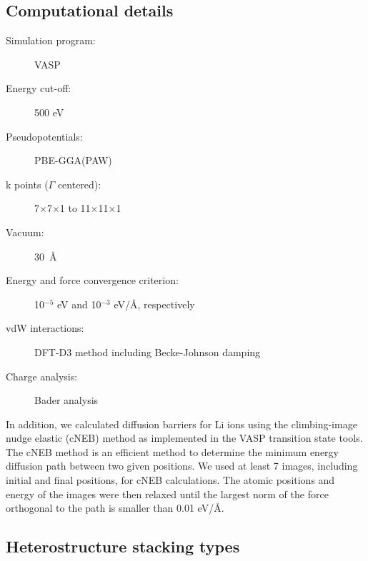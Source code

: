 \subsection{Computational details}
\begin{footnotesize}
\begin{description}
\item[Simulation program:] VASP
\item[Energy cut-off:] 500 eV
\item[Pseudopotentials:] PBE-GGA(PAW)
\item[k points ($\Gamma$ centered):] 7$\times$7$\times$1 to 11$\times$11$\times$1
\item[Vacuum:] 30~\AA
\item[Energy and force convergence criterion:] 10$^{-5}$ eV and 10$^{-3}$ eV/\AA, respectively
\item[vdW interactions:] DFT-D3 method \citet{Grimme2011} including Becke-Johnson damping
\item[Charge analysis:] Bader analysis \cite{Bader1,Bader2,Bader3,Bader4}
\end{description}
\end{footnotesize}
\vspace{0.5cm}

In addition, we calculated diffusion barriers for Li ions using the climbing-image nudge elastic (cNEB) method as implemented in the VASP transition state tools\cite{c-neb1,c-neb2}. The cNEB method is an efficient method to determine the minimum energy diffusion path between two given positions. We used at least 7 images, including initial and final positions, for cNEB calculations. The atomic positions and energy of the images were then relaxed until the largest norm of the force orthogonal to the path is smaller than 0.01 eV/{\AA}. 

\subsection{Heterostructure stacking types}

